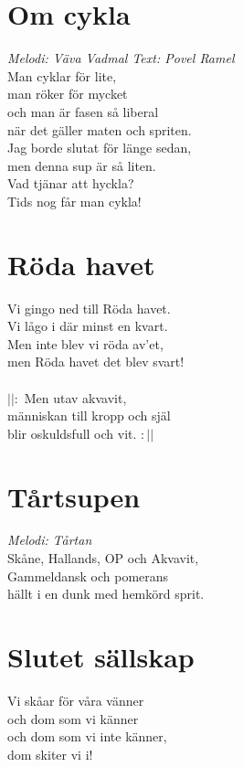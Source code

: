 \section{Om cykla}
\textit{Melodi: Väva Vadmal \vspace{5mm} Text: Povel Ramel}
\vspace{2mm}\\
Man cyklar för lite,\\
man röker för mycket \\
och man är fasen så liberal\\
när det gäller maten och spriten.\\
Jag borde slutat för länge sedan,\\
men denna sup är så liten.\\
Vad tjänar att hyckla? \\
Tids nog får man cykla!

\section{Röda havet}
Vi gingo ned till Röda havet.\\
Vi lågo i där minst en kvart.\\
Men inte blev vi röda av'et,\\
men Röda havet det blev svart! \\
\\
$||:$ Men utav akvavit,\\
människan till kropp och själ\\
blir oskuldsfull och vit. $:||$

\section{Tårtsupen}
\textit{Melodi: Tårtan}
\vspace{2mm}\\
Skåne, Hallands, OP och Akvavit,\\
Gammeldansk och pomerans\\
hällt i en dunk med hemkörd sprit.

\section{Slutet sällskap}
Vi skåar för våra vänner\\
och dom som vi känner\\
och dom som vi inte känner,\\
dom skiter vi i!

